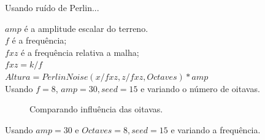 Usando ruído de Perlin...

$amp$ é a amplitude escalar do terreno.\\
$f$ é a frequência;\\
$fxz$ é a frequência relativa a malha;\\
$fxz = k/f$\\
$Altura = PerlinNoise(x/fxz, z/fxz, Octaves) * amp$\\

Usando $f = 8$, $amp = 30, seed = 15$ e variando o número de oitavas.

\begin{figure}[H]
     \centering
     \hspace{0.1cm}
     \hspace{0.1cm}
     \caption{Comparando influência das oitavas.}
     \label{fig:parametrosOctaves}
\end{figure}

Usando $amp = 30$ e $Octaves = 8, seed = 15$ e variando a frequência.

